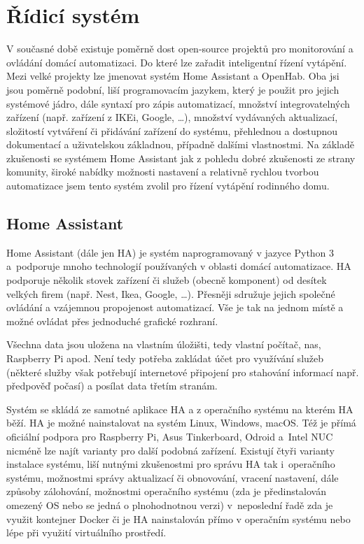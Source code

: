 \section{Řídicí systém}
V současné době existuje poměrně dost open-source projektů pro monitorování a ovládání domácí automatizaci. Do které lze zařadit inteligentní řízení vytápění. Mezi velké projekty lze jmenovat systém Home Assistant a OpenHab. Oba jsi jsou poměrně podobní, liší programovacím jazykem, který je použit pro jejich systémové jádro, dále syntaxí pro zápis automatizací, množství integrovatelných zařízení (např. zařízení z IKEi, Google, …), množství vydávaných aktualizací, složitostí vytváření či přidávání zařízení do systému, přehlednou a dostupnou dokumentací a uživatelskou základnou, případně dalšími vlastnostmi. Na základě zkušenosti se systémem Home Assistant jak z pohledu dobré zkušenosti ze strany komunity, široké nabídky možnosti nastavení a relativně rychlou tvorbou automatizace jsem tento systém zvolil pro řízení vytápění rodinného domu.

\subsection{Home Assistant}
Home Assistant (dále jen HA) je systém naprogramovaný v jazyce Python 3 a~podporuje mnoho technologií používaných v oblasti domácí automatizace. HA podporuje několik stovek zařízení či služeb (obecně komponent) od desítek velkých firem (např. Nest, Ikea, Google, …). Přesněji sdružuje jejich společné ovládání a vzájemnou propojenost automatizací. Vše je tak na
jednom místě a možné ovládat přes jednoduché grafické rozhraní.

Všechna data jsou uložena na vlastním úložišti, tedy vlastní počítač, nas, Raspberry Pi apod. Není tedy potřeba zakládat účet pro využívání služeb (některé služby však potřebují internetové připojení pro stahování informací např. předpověď počasí) a posílat data třetím stranám.

Systém se skládá ze samotné aplikace HA a z operačního systému na kterém HA běží. HA je možné nainstalovat na systém Linux, Windows, macOS. Též je přímá oficiální podpora pro Raspberry Pi, Asus Tinkerboard, Odroid a~Intel NUC nicméně lze najít varianty pro další podobná zařízení. Existují čtyři varianty instalace systému, liší nutnými zkušenostmi pro správu HA tak i~operačního systému, možnostmi správy aktualizací či obnovování, vracení nastavení, dále způsoby zálohování, možnostmi operačního systému (zda je předinstalován omezený OS nebo se jedná o plnohodnotnou verzi) v~neposlední řadě zda je využit kontejner Docker či je HA nainstalován přímo v operačním systému nebo lépe při využití virtuálního prostředí.


